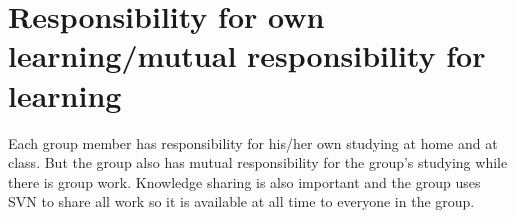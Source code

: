 \section{Responsibility for own learning/mutual responsibility for learning}
Each group member has responsibility for his/her own studying at home and at class. But the group also has mutual responsibility for the group's studying while there is group work. 
Knowledge sharing is also important and the group uses SVN to share all work so it is available at all time to everyone in the group.